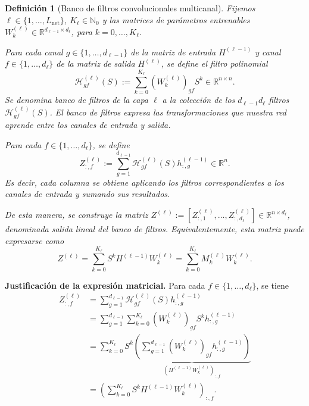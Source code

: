 \documentclass[a4paper,openany,oneside,10pt]{report}
\theoremstyle{pnlTeorema}
\theoremstyle{pnlDefinicion}
\newtheorem{definicion}{Definición}[section]
\theoremstyle{pnlObservacion}
\begin{document}
\begin{definicion}[Banco de filtros convolucionales multicanal]
\label{def:gcnn-banco}
Fijemos $\ell\in\{1,\ldots,L_{\mathrm{net}}\}$, $K_\ell\in\mathbb N_0$ y las matrices de parámetros entrenables $W_k^{(\ell)}\in\mathbb R^{d_{\ell-1}\times d_\ell}$, para $k=0,\ldots,K_\ell$.

Para cada canal $g\in\{1,\ldots,d_{\ell-1}\}$ de la matriz de entrada $H^{(\ell-1)}$ y canal $f\in\{1,\ldots,d_\ell\}$ de la matriz de salida $H^{(\ell)}$, se define el filtro polinomial
\[
\mathcal H_{gf}^{(\ell)}(S):=\sum_{k=0}^{K_\ell}(W_k^{(\ell)})_{gf}S^k\in\mathbb R^{n\times n}.
\]
Se denomina \emph{banco de filtros} de la capa $\ell$ a la colección de los $d_{\ell-1}d_\ell$ filtros $\mathcal H_{gf}^{(\ell)}(S)$.
El banco de filtros expresa las transformaciones que nuestra red aprende entre los canales de entrada y salida.

Para cada $f\in\{1,\ldots,d_\ell\}$, se define
\[
Z_{:,f}^{(\ell)}:=\sum_{g=1}^{d_{\ell-1}}\mathcal H_{gf}^{(\ell)}(S)h_{:,g}^{(\ell-1)}\in\mathbb R^n.
\]
Es decir, cada columna se obtiene aplicando los filtros correspondientes a los canales de entrada y sumando sus resultados.

De esta manera, se construye la matriz $Z^{(\ell)}:=[Z_{:,1}^{(\ell)},\ldots,Z_{:,d_\ell}^{(\ell)}]\in\mathbb R^{n\times d_\ell}$, denominada \emph{salida lineal del banco de filtros}. Equivalentemente, esta matriz puede expresarse como
\begin{equation}\label{eq:gcnn-preactivacion}
Z^{(\ell)}=\sum_{k=0}^{K_\ell}S^kH^{(\ell-1)}W_k^{(\ell)}=\sum_{k=0}^{K_\ell}M_k^{(\ell)}W_k^{(\ell)}.
\end{equation}
\end{definicion}

\noindent\textbf{Justificación de la expresión matricial.}
Para cada $f\in\{1,\ldots,d_\ell\}$, se tiene
\[
\begin{aligned}
Z_{:,f}^{(\ell)}
&=\sum_{g=1}^{d_{\ell-1}}\mathcal H_{gf}^{(\ell)}(S)h_{:,g}^{(\ell-1)}\\
&=\sum_{g=1}^{d_{\ell-1}}\sum_{k=0}^{K_\ell}(W_k^{(\ell)})_{gf}S^kh_{:,g}^{(\ell-1)}\\
&=\sum_{k=0}^{K_\ell}S^k\underbrace{\left(\sum_{g=1}^{d_{\ell-1}}(W_k^{(\ell)})_{gf}h_{:,g}^{(\ell-1)}\right)}_{(H^{(\ell-1)}W_k^{(\ell)})_{:,f}}\\
&=\left(\sum_{k=0}^{K_\ell}S^kH^{(\ell-1)}W_k^{(\ell)}\right)_{:,f}.
\end{aligned}
\]
\end{document}
